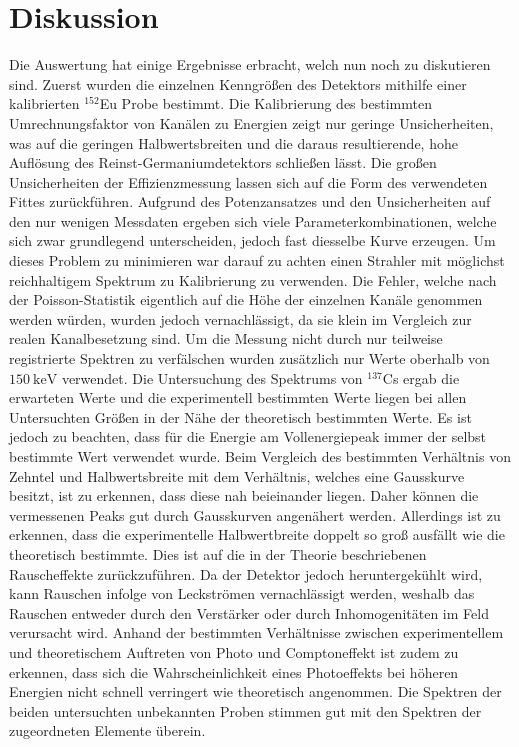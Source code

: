 
\section{Diskussion}
\label{sec:Diskussion}
Die Auswertung hat einige Ergebnisse erbracht, welch nun noch zu diskutieren sind. Zuerst wurden die einzelnen Kenngrößen des Detektors mithilfe einer kalibrierten $^{152}$Eu Probe bestimmt. Die Kalibrierung des bestimmten Umrechnungsfaktor von Kanälen zu Energien zeigt nur geringe Unsicherheiten, was auf die geringen Halbwertsbreiten und die daraus resultierende, hohe Auflösung des Reinst-Germaniumdetektors schließen lässt. Die großen Unsicherheiten der Effizienzmessung lassen sich auf die Form des verwendeten Fittes zurückführen. Aufgrund des Potenzansatzes und den Unsicherheiten auf den nur wenigen Messdaten ergeben sich viele Parameterkombinationen, welche sich zwar grundlegend unterscheiden, jedoch fast diesselbe Kurve erzeugen. Um dieses Problem zu minimieren war darauf zu achten einen Strahler mit möglichst reichhaltigem Spektrum zu Kalibrierung zu verwenden. Die Fehler, welche nach der Poisson-Statistik eigentlich auf die Höhe der einzelnen Kanäle genommen werden würden, wurden jedoch vernachlässigt, da sie klein im Vergleich zur realen Kanalbesetzung sind. Um die Messung nicht durch nur teilweise registrierte Spektren zu verfälschen wurden zusätzlich nur Werte oberhalb von $\SI{150}{\kilo\electronvolt}$ verwendet. Die Untersuchung des Spektrums von $^{137}$Cs ergab die erwarteten Werte und die experimentell bestimmten Werte liegen bei allen Untersuchten Größen in der Nähe der theoretisch bestimmten Werte. Es ist jedoch zu beachten, dass für die Energie am Vollenergiepeak immer der selbst bestimmte Wert verwendet wurde. Beim Vergleich des bestimmten Verhältnis von Zehntel und Halbwertsbreite mit dem Verhältnis, welches eine Gausskurve besitzt, ist zu erkennen, dass diese nah beieinander liegen. Daher können die vermessenen Peaks gut durch Gausskurven angenähert werden. Allerdings ist zu erkennen, dass die experimentelle Halbwertbreite doppelt so groß ausfällt wie die theoretisch bestimmte. Dies ist auf die in der Theorie beschriebenen Rauscheffekte zurückzuführen. Da der Detektor jedoch heruntergekühlt wird, kann Rauschen infolge von Leckströmen vernachlässigt werden, weshalb das Rauschen entweder durch den Verstärker oder durch Inhomogenitäten im Feld verursacht wird. Anhand der bestimmten Verhältnisse zwischen experimentellem und theoretischem Auftreten von Photo und Comptoneffekt ist zudem zu erkennen, dass sich die Wahrscheinlichkeit eines Photoeffekts bei höheren Energien nicht schnell verringert wie theoretisch angenommen. 
Die Spektren der beiden untersuchten unbekannten Proben stimmen gut mit den Spektren der zugeordneten Elemente überein.